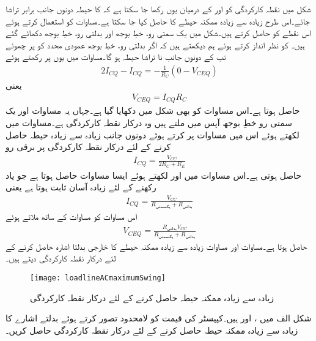 شکل  میں نقطہ کارکردگی کو  اور   کے درمیان یوں رکھا جا سکتا ہے کہ  کا حیطہ دونوں جانب برابر تراشا جائے۔اس طرح زیادہ سے زیادہ ممکنہ حیطے کا  حاصل کیا جا سکتا ہے۔مساوات  کو استعمال کرتے ہوئے اس نقطے کو حاصل کرتے ہیں۔شکل  میں یک سمتی رو، خطِ بوجھ اور بدلتی رو، خطِ بوجھ دکھائے گئے ہیں۔ کو نظر انداز کرتے ہوئے ہم دیکھتے ہیں کہ اگر بدلتی رو، خطِ بوجھ عمودی محدد کو  پر چھوئے تب  کے دونوں جانب نا تراشا حیطہ  ہو گا۔مساوات  میں یوں  پر  رکھتے ہوئے
 \begin{align*}
2 I_{CQ}-I_{CQ}=-\frac{1}{R_C} \left(0-V_{CEQ} \right)
\end{align*}
یعنی
 \begin{align}\label{مساوات_ٹرانزسٹر_زیادہ_حیطہ_الف}
V_{CEQ}=I_{CQ} R_C
\end{align}
حاصل ہوتا ہے۔اس مساوات کو بھی شکل میں دکھایا گیا ہے۔جہاں یہ مساوات اور یک سمتی رو خطِ بوجھ آپس میں ملتے ہیں وہ درکار نقطہ کارکردگی ہے۔مساوات  میں  لکھتے ہوئے اس میں مساوات  پر کرتے ہوئے دونوں جانب زیادہ سے زیادہ حیطہ حاصل کرنے کے لئے درکار نقطہ کارکردگی پر برقی رو 
\begin{align*}
I_{CQ}=\frac{V_{CC}}{2 R_C+R_E}
\end{align*}
حاصل ہوتی ہے۔اس مساوات میں  اور  لکھتے ہوئے ایسا مساوات حاصل ہوتا ہے جو یاد رکھنے کے لئے زیادہ آسان ثابت ہوتا ہے یعنی
\begin{align}\label{مساوات_ٹرانزسٹر_زیادہ_حیطہ_ب}
I_{CQ}=\frac{V_{CC}}{R_{\textrm{یکسمتی}}+R_{\textrm{بدلتی}}}
\end{align}
اس مساوات کو مساوات  کے ساتھ ملاتے ہوئے
\begin{align}\label{مساوات_ٹرانزسٹر_زیادہ_حیطہ_پ}
V_{CEQ}=\frac{R_{\textrm{بدلتی}} V_{CC}}{R_{\textrm{یکسمتی}}+R_{\textrm{بدلتی}}}
\end{align}
حاصل ہوتا ہے۔مساوات  اور مساوات  زیادہ سے زیادہ ممکنہ حیطے کا خارجی بدلتا اشارہ حاصل کرنے کے لئے درکار نقطہ کارکردگی دیتے ہیں۔ 
%
\begin{figure}
\centering
\texttt{[image: loadlineACmaximumSwing]}
\caption{زیادہ سے زیادہ ممکنہ حیطہ حاصل کرنے کے لئے درکار نقطہ کارکردگی}
\label{شکل_ٹرانزسٹر_زیادہ_حیطہ_نکتہ_کارکردگی}
\end{figure}
شکل  الف میں ،  اور
  ہیں۔کپیسٹر کی قیمت کو لامحدود تصور کرتے ہوئے بدلتے اشارے کا زیادہ سے زیادہ ممکنہ حیطہ حاصل کرنے کے لئے درکار نقطہ کارکردگی حاصل کریں۔

